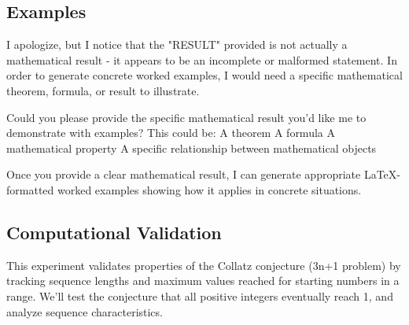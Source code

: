 \subsection{Examples}

\begin{example}\label{ex:1}
I apologize, but I notice that the "RESULT" provided is not actually a mathematical result - it appears to be an incomplete or malformed statement. In order to generate concrete worked examples, I would need a specific mathematical theorem, formula, or result to illustrate.

Could you please provide the specific mathematical result you'd like me to demonstrate with examples? This could be:
A theorem
A formula
A mathematical property
A specific relationship between mathematical objects

Once you provide a clear mathematical result, I can generate appropriate LaTeX-formatted worked examples showing how it applies in concrete situations.
\end{example}

\subsection{Computational Validation}

This experiment validates properties of the Collatz conjecture (3n+1 problem) by tracking sequence lengths and maximum values reached for starting numbers in a range. We'll test the conjecture that all positive integers eventually reach 1, and analyze sequence characteristics.

